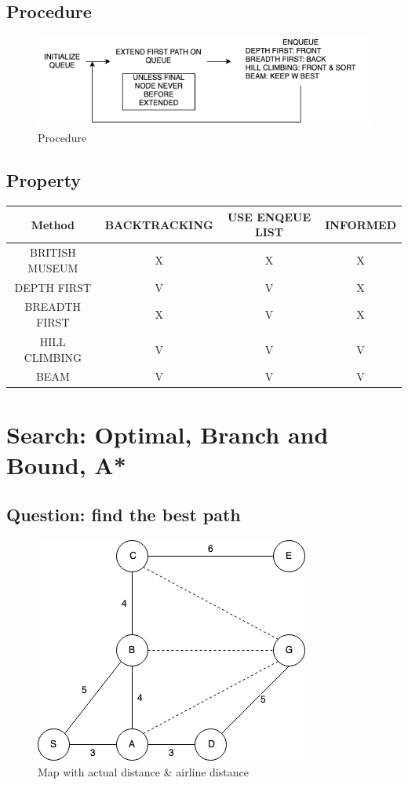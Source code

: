 \documentclass[12pt]{book}
\begin{document}
\subsection{Procedure}
\begin{figure}[ht]
	\centering
	\includegraphics[scale=0.8]{Figure/Figure4_5.png}
	\caption{Procedure}
\end{figure}
\subsection{Property}
\begin{table}[ht]
	\centering
	\begin{tabular}{|c|c|c|c|}
		\hline
		Method         & BACKTRACKING & USE ENQEUE LIST & INFORMED \\ \hline
		BRITISH MUSEUM & X            & X               & X        \\ \hline
		DEPTH FIRST    & V            & V               & X        \\ \hline
		BREADTH FIRST  & X            & V               & X        \\ \hline
		HILL CLIMBING  & V            & V               & V        \\ \hline
		BEAM           & V            & V               & V        \\ \hline
	\end{tabular}
\end{table}
\newpage
\section{Search: Optimal, Branch and Bound, A*}
\subsection{Question: find the best path}
\begin{figure}[ht]
	\centering
	\includegraphics[scale=0.8]{Figure/Figure5_1.png}
	\caption{Map with actual distance \& airline distance}
\end{figure}
\end{document}
